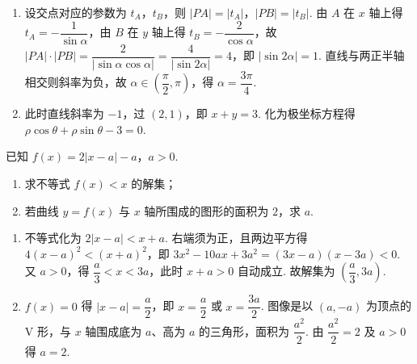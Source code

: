 \begin{solution}
\begin{enumerate}
\item 设交点对应的参数为 \(t_A\)，\(t_B\)，则 \(|PA|=|t_A|\)，\(|PB|=|t_B|\). 由 \(A\) 在 \(x\) 轴上得 \(t_A=-\dfrac1{\sin\alpha}\)，由 \(B\) 在 \(y\) 轴上得 \(t_B=-\dfrac2{\cos\alpha}\)，故 \(|PA|\cdot|PB|=\dfrac{2}{|\sin\alpha\cos\alpha|}=\dfrac{4}{|\sin2\alpha|}=4\)，即 \(|\sin2\alpha|=1\). 直线与两正半轴相交则斜率为负，故 \(\alpha\in\left(\dfrac{\pi}{2},\pi\right)\)，得 \(\alpha=\dfrac{3\pi}{4}\).
\item 此时直线斜率为 \(-1\)，过 \((2,1)\)，即 \(x+y=3\). 化为极坐标方程得 \(\rho\cos\theta+\rho\sin\theta-3=0\).
\end{enumerate}
\end{solution}

\begin{problem}
已知 \(f(x)=2|x-a|-a\)，\(a>0\).
\begin{enumerate}
\item 求不等式 \(f(x)<x\) 的解集；
\item 若曲线 \(y=f(x)\) 与 \(x\) 轴所围成的图形的面积为 \(2\)，求 \(a\).
\end{enumerate}
\end{problem}

\begin{solution}
\begin{enumerate}
\item 不等式化为 \(2|x-a|<x+a\). 右端须为正，且两边平方得 \(4(x-a)^2<(x+a)^2\)，即 \(3x^2-10ax+3a^2=(3x-a)(x-3a)<0\). 又 \(a>0\)，得 \(\dfrac{a}{3}<x<3a\)，此时 \(x+a>0\) 自动成立. 故解集为 \(\left(\dfrac{a}{3},3a\right)\).
\item \(f(x)=0\) 得 \(|x-a|=\dfrac{a}{2}\)，即 \(x=\dfrac{a}{2}\) 或 \(x=\dfrac{3a}{2}\). 图像是以 \((a,-a)\) 为顶点的 V 形，与 \(x\) 轴围成底为 \(a\)、高为 \(a\) 的三角形，面积为 \(\dfrac{a^2}{2}\). 由 \(\dfrac{a^2}{2}=2\) 及 \(a>0\) 得 \(a=2\).
\end{enumerate}
\end{solution}
